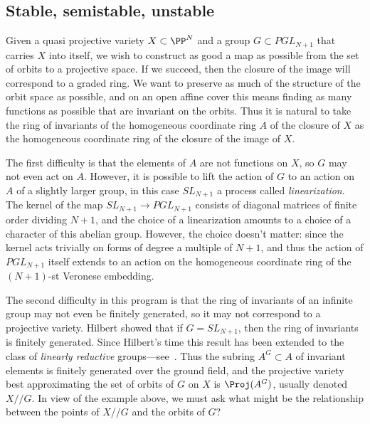 \subsection{Stable, semistable, unstable}

Given a quasi projective variety $X \subset \PP^N$ and a group $G \subset PGL_{N+1}$ that carries $X$ into itself, we wish to construct as good a map as possible from the set of orbits
to a projective space. If we succeed, then the closure of the
image will correspond to a graded ring. We want to preserve as much of the structure of the orbit space as possible, and on an open affine cover
this means finding as many functions as possible that are invariant on the orbits. Thus it is natural to take the ring of invariants
of the homogeneous coordinate ring $A$ of the closure of $X$ as the homogeneous coordinate ring of the closure
of the image of $X$. 

The first difficulty is that the elements of $A$ are not functions on $X$, so $G$ may not even act on $A$. However, 
it is possible to lift the action of $G$ to an action on $A$ of a slightly larger group, in this case
$SL_{N+1}$ a process called \emph{linearization}. The kernel of the map $SL_{N+1} \to PGL_{N+1}$ consists of diagonal matrices of finite order dividing $N+1$, and the choice of
a linearization amounts to a choice of a character of this abelian group. However, the choice doesn't matter: since the kernel acts trivially on forms of degree a multiple
of $N+1$, and thus the action of $PGL_{N+1}$ itself  extends to an action on the homogeneous coordinate ring of the $(N+1)$-st Veronese embedding. 

The second difficulty in this program is that the ring of invariants of an infinite group may not even be finitely generated,
so it may not correspond to a projective variety. Hilbert showed that if $G= SL_{N+1}$, then the ring of invariants
is finitely generated. Since Hilbert's time this result has been extended to the class of 
\emph{linearly reductive} groups---see~\cite{MR0382294}.
Thus the subring $A^G \subset A$ of invariant elements is finitely generated over the ground field, and the projective variety best approximating the set of orbits of $G$ on $X$ 
is $\Proj(A^G)$, usually denoted $X//G$. In view of the example above, we must ask what might be
the relationship between the points of $X//G$ and the orbits of $G$? 

